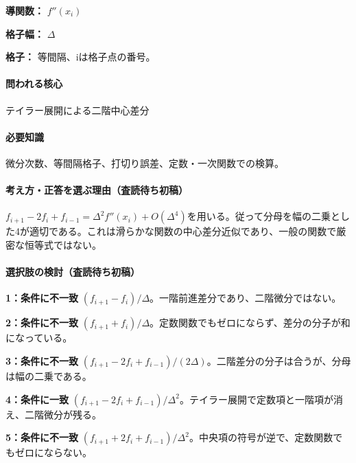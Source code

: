\noindent\textbf{導関数：} \(f''(x_i)\)\par

\noindent\textbf{格子幅：} \(\Delta\)\par

\noindent\textbf{格子：} 等間隔、iは格子点の番号。\par

\paragraph{問われる核心} テイラー展開による二階中心差分

\paragraph{必要知識} 微分次数、等間隔格子、打切り誤差、定数・一次関数での検算。

\paragraph{考え方・正答を選ぶ理由（査読待ち初稿）} \(f_{i+1}-2f_i+f_{i-1}=\Delta^2f''(x_i)+O(\Delta^4)\)を用いる。従って分母を幅の二乗とした4が適切である。これは滑らかな関数の中心差分近似であり、一般の関数で厳密な恒等式ではない。

\paragraph{選択肢の検討（査読待ち初稿）}\mbox{}\par

\noindent\textbf{1：条件に不一致} \((f_{i+1}-f_i)/\Delta\)。一階前進差分であり、二階微分ではない。\par

\noindent\textbf{2：条件に不一致} \((f_{i+1}+f_i)/\Delta\)。定数関数でもゼロにならず、差分の分子が和になっている。\par

\noindent\textbf{3：条件に不一致} \((f_{i+1}-2f_i+f_{i-1})/(2\Delta)\)。二階差分の分子は合うが、分母は幅の二乗である。\par

\noindent\textbf{4：条件に一致} \((f_{i+1}-2f_i+f_{i-1})/\Delta^2\)。テイラー展開で定数項と一階項が消え、二階微分が残る。\par

\noindent\textbf{5：条件に不一致} \((f_{i+1}+2f_i+f_{i-1})/\Delta^2\)。中央項の符号が逆で、定数関数でもゼロにならない。\par

